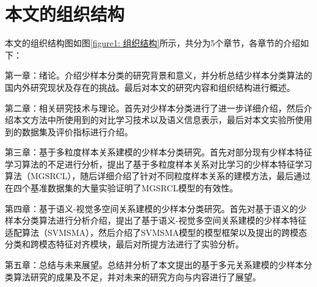 \section[\hspace{-2pt}本文组织结构]{{\heiti{} \hspace{-8pt}本文的组织结构}}\label{section1: 本文组织结构}

本文的组织结构图如图\ref{figure1: 组织结构}所示，共分为5个章节，各章节的介绍如下：

第一章：绪论。介绍少样本分类的研究背景和意义，并分析总结少样本分类算法的国内外研究现状及存在的挑战。最后对本文的研究内容和组织结构进行概述。

第二章：相关研究技术与理论。首先对少样本分类进行了进一步详细介绍，然后介绍本文方法中所使用到的对比学习技术以及语义信息表示，最后对本文实验所使用到的数据集及评价指标进行介绍。

第三章：基于多粒度样本关系建模的少样本分类研究。首先对部分现有少样本特征学习算法的不足进行分析，提出了基于多粒度样本关系对比学习的少样本特征学习算法（MGSRCL），随后详细介绍了针对不同粒度样本关系的建模方法，最后通过在四个基准数据集的大量实验证明了MGSRCL模型的有效性。

第四章：基于语义-视觉多空间关系建模的少样本分类研究。首先对基于语义的少样本分类算法进行分析介绍，提出了基于语义-视觉多空间关系建模的少样本特征适配算法（SVMSMA），然后介绍了SVMSMA模型的模型框架以及提出的跨模态分类和跨模态特征对齐模块，最后对所提方法进行了实验分析。

第五章：总结与未来展望。总结并分析了本文提出的基于多元关系建模的少样本分类算法研究的成果及不足，并对未来的研究方向与内容进行了展望。


